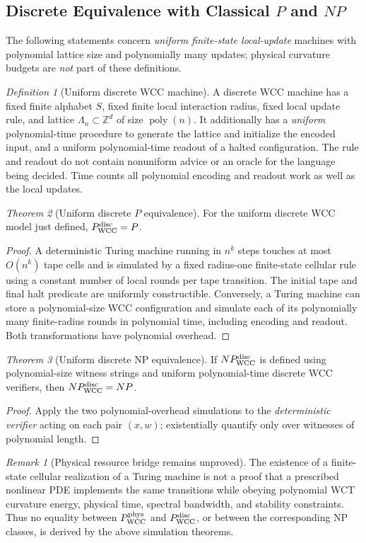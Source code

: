 \documentclass[12pt]{article}
\theoremstyle{remark}
\newtheorem*{remark}{Remark}
\newtheorem{theorem}{Theorem}[section]
\newtheorem{definition}[theorem]{Definition}
\begin{document}
\subsection{Discrete Equivalence with Classical $P$ and $NP$}
\label{sec:discrete-equivalence}
The following statements concern \emph{uniform finite-state local-update}
machines with polynomial lattice size and polynomially many updates;
physical curvature budgets are \emph{not} part of these definitions.
\begin{definition}[Uniform discrete WCC machine]
A discrete WCC machine has a fixed finite alphabet $S$, fixed finite
local interaction radius, fixed local update rule, and lattice
$\Lambda_n\subset\mathbb Z^d$ of size $\operatorname{poly}(n)$.
It additionally has a \emph{uniform} polynomial-time procedure to
generate the lattice and initialize the encoded input, and a uniform
polynomial-time readout of a halted configuration. The rule and
readout do not contain nonuniform advice or an oracle for the
language being decided. Time counts all polynomial encoding and
readout work as well as the local updates.
\end{definition}
\begin{theorem}[Uniform discrete $P$ equivalence]
\label{thm:P-equivalence}
For the uniform discrete WCC model just defined,
$P_{\rm WCC}^{\rm disc}=P$.
\end{theorem}
\begin{proof}
A deterministic Turing machine running in $n^k$ steps touches
at most $O(n^k)$ tape cells and is simulated by a fixed radius-one
finite-state cellular rule using a constant number of local rounds
per tape transition. The initial tape and final halt predicate are
uniformly constructible. Conversely, a Turing machine can store a
polynomial-size WCC configuration and simulate each of its
polynomially many finite-radius rounds in polynomial time,
including encoding and readout. Both transformations have
polynomial overhead.
\end{proof}
\begin{theorem}[Uniform discrete NP equivalence]
\label{thm:NP-equivalence}
If $NP_{\rm WCC}^{\rm disc}$ is defined using polynomial-size
witness strings and uniform polynomial-time discrete WCC
verifiers, then $NP_{\rm WCC}^{\rm disc}=NP$.
\end{theorem}
\begin{proof}
Apply the two polynomial-overhead simulations to the
\emph{deterministic verifier} acting on each pair $(x,w)$;
existentially quantify only over witnesses of polynomial length.
\end{proof}
\begin{remark}[Physical resource bridge remains unproved]
\label{rem:physical-bridge}
The existence of a finite-state cellular realization of a Turing
machine is not a proof that a prescribed nonlinear PDE implements
the same transitions while obeying polynomial WCT curvature energy,
physical time, spectral bandwidth, and stability constraints.
Thus no equality between $P_{\rm WCC}^{\rm phys}$ and
$P_{\rm WCC}^{\rm disc}$, or between the corresponding NP classes,
is derived by the above simulation theorems.
\end{remark}
\end{document}
